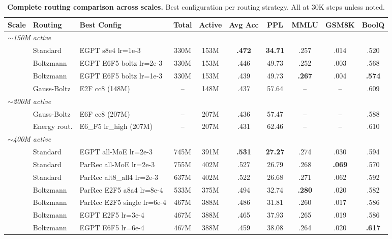 \documentclass[oneside]{article}
\begin{document}
\begin{table}[t]
\centering
\caption{\textbf{Complete routing comparison across scales.} Best configuration per routing strategy. All at 30K steps unless noted.}
\label{tab:moe_summary}
\begin{adjustbox}{max width=\textwidth}
\begin{tabular}{l|l|l|cc|c|c|cc|c}
\toprule
\textbf{Scale} & \textbf{Routing} & \textbf{Best Config} & \textbf{Total} & \textbf{Active} & \textbf{Avg Acc} & \textbf{PPL} & \textbf{MMLU} & \textbf{GSM8K} & \textbf{BoolQ} \\
\midrule
\multicolumn{10}{l}{\textit{$\sim$150M active}} \\
 & Standard     & EGPT s8e4 lr=1e-3            & 330M & 153M & \textbf{.472} & \textbf{34.71} & .257 & .014 & .520 \\
 & Boltzmann    & EGPT E6F5 boltz lr=2e-3      & 330M & 153M & .446 & 49.73 & .252 & .003 & .568 \\
 & Boltzmann    & EGPT E6F5 boltz lr=1e-3      & 330M & 153M & .439 & 49.73 & \textbf{.267} & .004 & \textbf{.574} \\
 & Gauss-Boltz  & E2F cc8 (148M)               & --   & 148M & .437 & 57.64 & --   & -- & .609 \\
\midrule
\multicolumn{10}{l}{\textit{$\sim$200M active}} \\
 & Gauss-Boltz  & E6F cc8 (207M)               & --   & 207M & .436 & 57.47 & --   & -- & .588 \\
 & Energy rout. & E6\_F5 lr\_high (207M)        & --   & 207M & .431 & 62.46 & --   & -- & .610 \\
\midrule
\multicolumn{10}{l}{\textit{$\sim$400M active}} \\
 & Standard     & EGPT all-MoE lr=2e-3         & 745M & 391M & \textbf{.531} & \textbf{27.27} & .274 & .030 & .594 \\
 & Standard     & ParRec all-MoE lr=2e-3       & 755M & 402M & .527 & 26.79 & .268 & \textbf{.069} & .570 \\
 & Standard     & ParRec alt8\_all4 lr=2e-3    & 637M & 402M & .522 & 26.68 & .271 & .062 & .592 \\
 & Boltzmann    & ParRec E2F5 a8a4 lr=8e-4     & 533M & 375M & .494 & 32.74 & \textbf{.280} & .020 & .582 \\
 & Boltzmann    & ParRec E2F5 single lr=6e-4   & 467M & 388M & .486 & 31.81 & .260 & .017 & .586 \\
 & Boltzmann    & EGPT E2F5 lr=3e-4            & 467M & 388M & .465 & 37.93 & .265 & .019 & .586 \\
 & Boltzmann    & EGPT E6F5 lr=6e-4            & 467M & 388M & .459 & 38.08 & .264 & .020 & \textbf{.617} \\
\bottomrule
\end{tabular}
\end{adjustbox}
\end{table}
\end{document}
